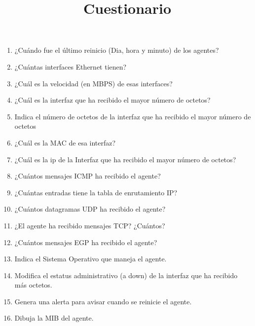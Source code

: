 \title{Cuestionario}
\begin{enumerate}
\item ¿Cuándo fue el último reinicio (Dia, hora y minuto)  de los agentes?
\item ¿Cuántas interfaces Ethernet tienen?
\item ¿Cuál es la velocidad (en MBPS) de esas interfaces?
\item ¿Cuál es la interfaz que ha recibido el mayor número de octetos?
\item Indica el número de octetos  de la interfaz que ha recibido el mayor número de octetos
\item ¿Cuál es la MAC de esa interfaz?
\item ¿Cuál es la ip de la Interfaz que ha recibido el mayor número de octetos?
\item ¿Cuántos mensajes ICMP ha recibido el agente?
\item ¿Cuántas entradas tiene la tabla de enrutamiento IP?
\item ¿Cuántos datagramas UDP ha recibido el agente?
\item ¿El agente ha recibido mensajes TCP? ¿Cuántos?
\item ¿Cuántos mensajes EGP ha recibido el agente?
\item Indica el Sistema Operativo que maneja el agente.
\item Modifica el estatus administrativo (a down) de la interfaz que ha recibido más octetos.
\item Genera una alerta para avisar cuando se reinicie el agente.
\item Dibuja la MIB del agente.
\end{enumerate}